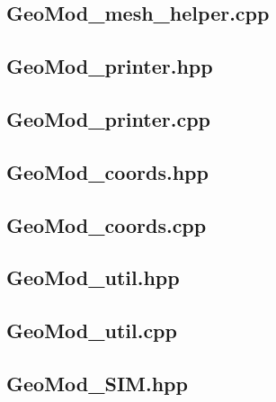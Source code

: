 \documentclass[a4paper, 12pt]{article}
\begin{document}
\subsection{GeoMod\_mesh\_helper.cpp} \label{subsec:mesh_cpp}


\subsection{GeoMod\_printer.hpp} \label{subsec:printer_hpp}

\subsection{GeoMod\_printer.cpp} \label{subsec:printer_cpp}


\subsection{GeoMod\_coords.hpp} \label{subsec:coords_hpp}

\subsection{GeoMod\_coords.cpp} \label{subsec:coords_cpp}


\subsection{GeoMod\_util.hpp} \label{subsec:util_hpp}

\subsection{GeoMod\_util.cpp} \label{subsec:util_cpp}


\subsection{GeoMod\_SIM.hpp} \label{subsec:SIM_hpp}

\end{document}
